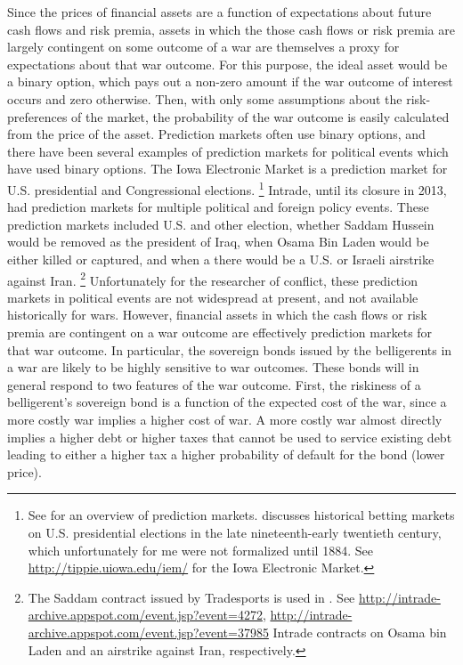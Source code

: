 Since the prices of financial assets are a function of expectations about future cash flows and risk premia, assets in which the those cash flows or risk premia are largely contingent on some outcome of a war are themselves a proxy for expectations about that war outcome.
For this purpose, the ideal asset would be a binary option, which pays out a non-zero amount if the war outcome of interest occurs and zero otherwise.
Then, with only some assumptions about the risk-preferences of the market, the probability of the war outcome is easily calculated from the price of the asset.
Prediction markets often use binary options, and there have been several examples of prediction markets for political events which have used binary options.
The Iowa Electronic Market is a prediction market for U.S. presidential and Congressional elections.%
\footnote{
  See \textcite{WolfersZitzewitz2004} for an overview of prediction markets.
  \textcite{RhodeStrumpf2004a} discusses historical betting markets on U.S. presidential elections in the late nineteenth-early twentieth century, which unfortunately for me were not formalized until 1884.
  See \url{http://tippie.uiowa.edu/iem/} for the Iowa Electronic Market.
}
Intrade, until its closure in 2013, had prediction markets for multiple political and foreign policy events.
These prediction markets included U.S. and other election, whether Saddam Hussein would be removed as the president of Iraq, when Osama Bin Laden would be either killed or captured, and when a there would be a U.S. or Israeli airstrike against Iran.%
\footnote{
  The Saddam contract issued by Tradesports is used in \textcite{LeighWolfersEtAl2003}.
  See \url{http://intrade-archive.appspot.com/event.jsp?event=4272}, \url{http://intrade-archive.appspot.com/event.jsp?event=37985} Intrade contracts on Osama bin Laden and an airstrike against Iran, respectively.
}
Unfortunately for the researcher of conflict, these prediction markets in political events are not widespread at present, and not available historically for wars.
However, financial assets in which the cash flows or risk premia are contingent on a war outcome are effectively prediction markets for that war outcome.
In particular, the sovereign bonds issued by the belligerents in a war are likely to be highly sensitive to war outcomes.
These bonds will in general respond to two features of the war outcome.
First, the riskiness of a belligerent's sovereign bond is a function of the expected cost of the war, since a more costly war implies a higher cost of war.
A more costly war almost directly implies a higher debt or higher taxes that cannot be used to service existing debt leading to either a higher tax  a higher probability of default for the bond (lower price).
